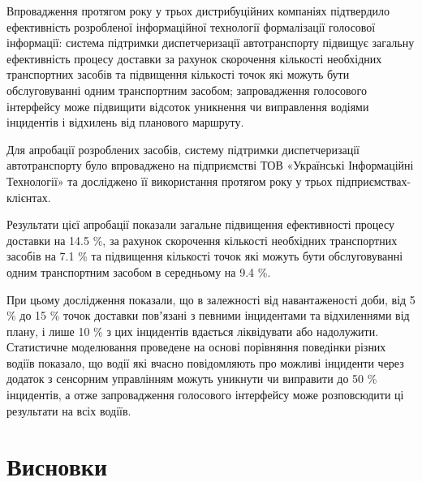 Впровадження протягом року у трьох дистрибуційних компаніях підтвердило ефективність розробленої інформаційної технології формалізації голосової інформації: система підтримки диспетчеризації автотранспорту підвищує загальну ефективність процесу доставки за рахунок скорочення кількості необхідних транспортних засобів та підвищення кількості точок які можуть бути обслуговуванні одним транспортним засобом; запровадження голосового інтерфейсу може підвищити відсоток уникнення чи виправлення водіями інцидентів і відхилень від планового маршруту.

Для апробації розроблених засобів, систему підтримки диспетчеризації автотранспорту було впроваджено на підприємстві ТОВ «Українські Інформаційні Технології» та досліджено її використання протягом року у трьох підприємствах-клієнтах.

Результати цієї апробації показали загальне підвищення ефективності процесу доставки на 14.5 \%, за рахунок скорочення кількості необхідних транспортних засобів на 7.1 \% та підвищення кількості точок які можуть бути обслуговуванні одним транспортним засобом в середньому на 9.4 \%.


При цьому дослідження показали, що в залежності від навантаженості доби, від 5 \% до 15 \% точок доставки повʼязані з певними інцидентами та відхиленнями від плану, і лише 10 \% з цих інцидентів вдається ліквідувати або надолужити. Статистичне моделювання проведене на основі порівняння поведінки різних водіїв показало, що водії які вчасно повідомляють про можливі інциденти через додаток з сенсорним управлінням можуть уникнути чи виправити до 50 \% інцидентів, а отже запровадження голосового інтерфейсу може розповсюдити ці результати на всіх водіїв.

\section*{Висновки}






